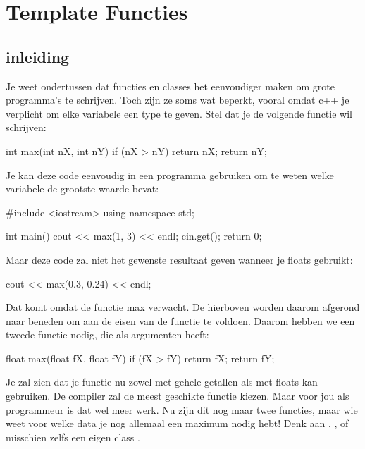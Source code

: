 \documentclass[11pt, oldfontcommands, oneside, a4paper]{memoir}
\begin{document}
\chapter{Template Functies}

\section{inleiding}

Je weet ondertussen dat functies en classes het eenvoudiger maken om grote programma's te schrijven. Toch zijn ze soms wat beperkt, vooral omdat c++ je verplicht om elke variabele een type te geven. Stel dat je de volgende functie wil schrijven:

\begin{code}
int max(int nX, int nY) {
	if (nX > nY) return nX;
	return nY;
}
\end{code}

Je kan deze code eenvoudig in een programma gebruiken om te weten welke variabele de grootste waarde bevat:

\begin{code}
#include <iostream>
using namespace std;

int main() {
	cout << max(1, 3) << endl;
	cin.get();	
	return 0;
}
\end{code}

Maar deze code zal niet het gewenste resultaat geven wanneer je floats gebruikt:

\begin{code}
cout << max(0.3, 0.24) << endl;
\end{code}

Dat komt omdat de functie max  verwacht. De  hierboven worden daarom afgerond naar beneden om aan de eisen van de functie  te voldoen. Daarom hebben we een tweede functie  nodig, die  als argumenten heeft:

\begin{code}
float max(float fX, float fY) {
	if (fX > fY) return fX;
	return fY;
}
\end{code}

Je zal zien dat je functie  nu zowel met gehele getallen als met floats kan gebruiken. De compiler zal de meest geschikte functie kiezen. Maar voor jou als programmeur is dat wel meer werk. Nu zijn dit nog maar twee functies, maar wie weet voor welke data je nog allemaal een maximum nodig hebt! Denk aan , , of misschien zelfs een eigen class .
\end{document}
